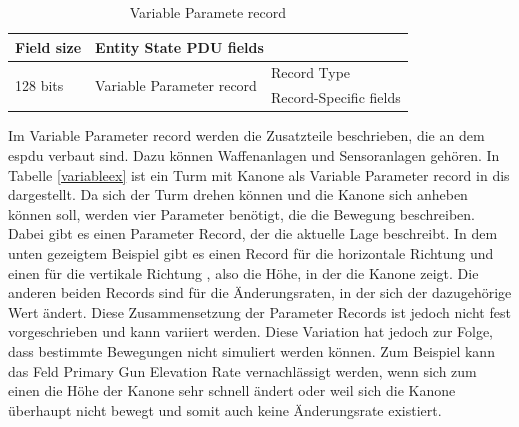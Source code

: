 \begin{table}[H]
	\centering
	\begin{tabular}{|l|l|l|}
		\hline
		Field size                & \multicolumn{2}{l|}{Entity State PDU fields}                        \\ \hline
		\multirow{2}{*}{128 bits} & \multirow{2}{*}{Variable Parameter record} & Record Type            \\ \cline{3-3} 
		&                                            & Record-Specific fields \\ \hline
	\end{tabular}
\caption[Variable Parameter record ]{Variable Paramete record\cite{SISOStandardsActivityCommitteeoftheIEEEComputerSociety.}}
\label{variable}
\end{table}
Im Variable Parameter record werden die Zusatzteile beschrieben, die an dem \ac{espdu} verbaut sind. Dazu können Waffenanlagen und Sensoranlagen gehören. In Tabelle \ref{variableex} ist ein Turm mit Kanone als  Variable Parameter record in \ac{dis} dargestellt. Da sich der Turm drehen können und die Kanone sich anheben können soll, werden vier Parameter benötigt, die die Bewegung beschreiben. Dabei gibt es einen Parameter Record, der die aktuelle Lage beschreibt. In dem unten gezeigtem Beispiel gibt es einen  Record für die horizontale Richtung und einen für die vertikale Richtung , also die Höhe, in der die Kanone zeigt. Die anderen beiden Records sind für die Änderungsraten, in der sich der dazugehörige Wert ändert. Diese Zusammensetzung der Parameter Records ist jedoch nicht fest vorgeschrieben und kann variiert werden. Diese Variation hat jedoch zur Folge, dass bestimmte Bewegungen nicht simuliert werden können. Zum Beispiel kann das Feld \glqq Primary Gun Elevation Rate\grqq{}  vernachlässigt werden, wenn sich zum einen die Höhe der Kanone sehr schnell ändert oder weil sich die Kanone überhaupt nicht bewegt und somit auch keine Änderungsrate existiert.  
  

